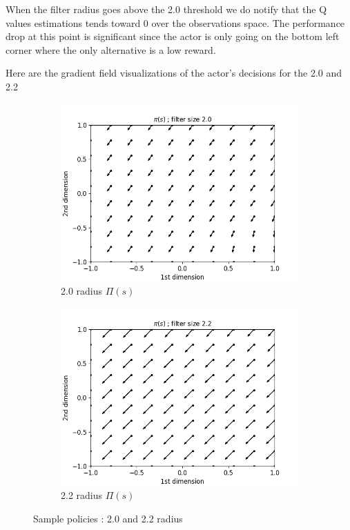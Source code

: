 \documentclass{article}
\begin{document}
When the filter radius goes above the 2.0 threshold we do notify that the Q values estimations tends toward 0 over the observations space. The performance drop at this point is significant since the actor is only going on the bottom left corner where the only alternative is a low reward.

Here are the gradient field visualizations of the actor's decisions for the 2.0 and 2.2

\begin{figure}[H]
  \centering
  \hspace{1cm}
   \begin{subfigure}[b]{0.35\linewidth}
    \includegraphics[width=\linewidth]{Study_2/2.3/visualizations/Pi_arrow_2_0.png}
      \caption{2.0 radius $\Pi(s)$}
  \end{subfigure}
  \hspace{1cm}
   \begin{subfigure}[b]{0.35\linewidth}
    \includegraphics[width=\linewidth]{Study_2/2.3/visualizations/Pi_arrow_2_2.png}
      \caption{2.2 radius $\Pi(s)$}
  \end{subfigure}
  \hspace{1cm}
  \caption{Sample policies : 2.0 and 2.2 radius}
  \label{samples_policies_uniform_corner}
  \end{figure}
\end{document}
